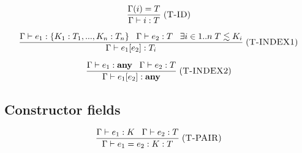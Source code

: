 \documentclass[12pt]{article}
\newcommand{\Any}{\mathbf{any}}
\newcommand{\mylabel}[1]{\; (\textsc{#1})}
\newcommand{\env}{\Gamma}
\begin{document}
\[
\frac{\env(i) = T}
     {\env \vdash i : T}
\mylabel{T-ID}
\]

\[
\frac{\env \vdash e_{1} : \{ K_{1}:T_{1}, ..., K_{n}:T_{n} \} \;\;\;
      \env \vdash e_{2} : T \;\;\;
      \exists i \in 1..n \; T \lesssim K_{i}}
     {\env \vdash e_{1}[e_{2}] : T_{i}}
\mylabel{T-INDEX1}
\]

\[
\frac{\env \vdash e_{1}:\Any \;\;\;
      \env \vdash e_{2}:T}
     {\env \vdash e_{1}[e_{2}] : \Any}
\mylabel{T-INDEX2}
\]

\subsection{Constructor fields}

\[
\frac{\env \vdash e_{1} : K \;\;\;
      \env \vdash e_{2} : T}
     {\env \vdash e_{1} = e_{2} : K:T}
\mylabel{T-PAIR}
\]
\end{document}
